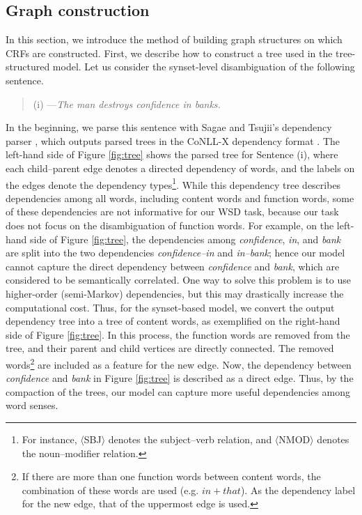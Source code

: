\documentclass[english]{jnlp_1.4}
\begin{document}
\subsection{Graph construction}
\label{section:graph-construction}

In this section, we introduce the method of building graph structures on which CRFs are constructed.
First, we describe how to construct a tree used in the tree-structured model.
Let us consider the synset-level disambiguation of the following sentence.

\begin{quote}
(i) ---\textit{The man destroys confidence in banks.}
\end{quote}

In the beginning, we parse this sentence with Sagae and Tsujii's dependency parser \cite{sagae:2007}, which outputs parsed trees in the CoNLL-X dependency format \cite{buchholz:2006}.
The left-hand side of Figure \ref{fig:tree} shows the parsed tree for Sentence (i), where each child--parent edge denotes a directed dependency of words, and the labels on the edges denote the dependency types\footnote{For instance, $\langle$SBJ$\rangle$ denotes the subject--verb relation, and $\langle$NMOD$\rangle$ denotes the noun--modifier relation.}.
While this dependency tree describes dependencies among all words, including content words and function words, some of these dependencies are not informative for our WSD task, because our task does not focus on the disambiguation of function words.
For example, on the left-hand side of Figure \ref{fig:tree}, the dependencies among \textit{confidence}, \textit{in}, and \textit{bank} are split into the two dependencies \textit{confidence--in} and \textit{in--bank}; hence our model cannot capture the direct dependency between \textit{confidence} and \textit{bank}, which are considered to be semantically correlated.
One way to solve this problem is to use higher-order (semi-Markov) dependencies, but this may drastically increase the computational cost.
Thus, for the synset-based model, we convert the output dependency tree into a tree of content words, as exemplified on the right-hand side of Figure \ref{fig:tree}.
In this process, the function words are removed from the tree, and their parent and child vertices are directly connected.
The removed words\footnote{If there are more than one function words between content words, the combination of these words are used (e.g. $in + that$). As the dependency label for the new edge, that of the uppermost edge is used.} are included as a feature for the new edge.
Now, the dependency between \textit{confidence} and \textit{bank} in Figure \ref{fig:tree} is described as a direct edge.
Thus, by the compaction of the trees, our model can capture more useful dependencies among word senses.
\end{document}
